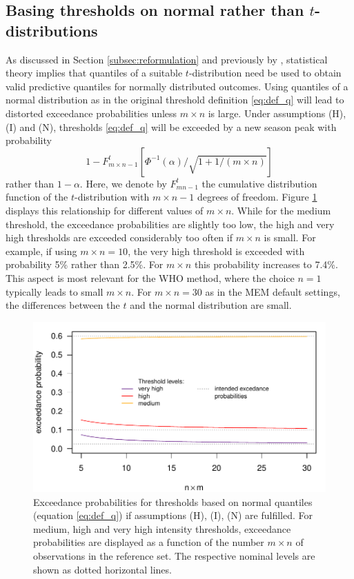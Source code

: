 \documentclass[12pt]{article}
\begin{document}
\subsection{Basing thresholds on normal rather than $t$-distributions}
\label{subsec:normal_vs_t}

As discussed in Section \ref{subsec:reformulation} and previously by \cite{Allevius2020}, statistical theory implies that quantiles of a suitable $t$-distribution need be used to obtain valid predictive quantiles for normally distributed outcomes. Using quantiles of a normal distribution as in the original threshold definition \eqref{eq:def_q} will lead to distorted exceedance probabilities unless $m \times n$ is large. Under assumptions (H), (I) and (N), thresholds \eqref{eq:def_q} will be exceeded by a new season peak with probability
$$
1 - F^t_{m\times n - 1}\left[\Phi^{-1}(\alpha)/\sqrt{1 + 1/(m \times n)}\right]
$$
rather than $1 - \alpha$. Here, we denote by $F^t_{mn - 1}$ the cumulative distribution function of the $t$-distribution with $m \times n - 1$ degrees of freedom. Figure \ref{fig:calibration_t_normal} displays this relationship for different values of $m \times n$. While for the medium threshold, the exceedance probabilities are slightly too low, the high and very high thresholds are exceeded considerably too often if $m \times n$ is small. For example, if using $m \times n = 10$, the very high threshold is exceeded with probability 5\% rather than 2.5\%. For $m \times n$ this probability increases to 7.4\%. This aspect is most relevant for the WHO method, where the choice $n = 1$ typically leads to small $m \times n$. For $m \times n = 30$ as in the MEM default settings, the differences between the $t$ and the normal distribution are small.

\begin{figure}[h!]
\begin{center}
\includegraphics[scale=0.6]{figure/exceedance_prob_normal.pdf}
\end{center}
\caption{Exceedance probabilities for thresholds based on normal quantiles (equation \eqref{eq:def_q}) if assumptions (H), (I), (N) are fulfilled. For medium, high and very high intensity thresholds, exceedance probabilities are displayed as a function of the number $m \times n$ of observations in the reference set. The respective nominal levels are shown as dotted horizontal lines.}
\label{fig:calibration_t_normal}
\end{figure}
\end{document}
